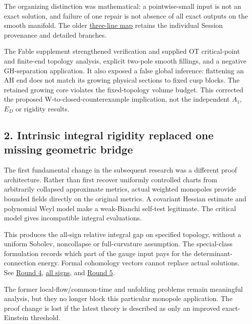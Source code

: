 \documentclass[
  10pt,
]{article}
\begin{document}
The organizing distinction was mathematical: a pointwise-small input is
not an exact solution, and failure of one repair is not absence of all
exact outputs on the smooth manifold. The older
\href{../mathematics/current/skill/references/research-map.md}{three-line
map} retains the individual Session provenance and detailed branches.

The Fable supplement strengthened verification and supplied OT
critical-point and finite-end topology analysis, explicit two-pole
smooth fillings, and a negative GH-separation application. It also
exposed a false global inference: flattening an AH end does not match
its growing physical sections to fixed cusp blocks. The retained growing
core violates the fixed-topology volume budget. This corrected the
proposed W-to-closed-counterexample implication, not the independent
\(A_1\), \(E_D\) or rigidity results.

\hypertarget{intrinsic-integral-rigidity-replaced-one-missing-geometric-bridge}{%
\subsection{2. Intrinsic integral rigidity replaced one missing
geometric
bridge}\label{intrinsic-integral-rigidity-replaced-one-missing-geometric-bridge}}

The first fundamental change in the subsequent research was a different
proof architecture. Rather than first recover uniformly controlled
charts from arbitrarily collapsed approximate metrics, actual weighted
monopoles provide bounded fields directly on the original metrics. A
covariant Hessian estimate and polynomial Weyl model make a weak-Bianchi
self-test legitimate. The critical model gives incompatible integral
evaluations.

This produces the all-sign relative integral gap on specified topology,
without a uniform Sobolev, noncollapse or full-curvature assumption. The
special-class formulation records which part of the gauge input pays for
the determinant-connection energy. Formal cohomology vectors cannot
replace actual solutions. See
\href{../mathematics/current/round4_rigidity.md}{Round 4},
\href{../mathematics/current/round4_all_sign_gap.md}{all signs}, and
\href{../mathematics/current/round5_rigidity.md}{Round 5}.

The former local-flow/common-time and unfolding problems remain
meaningful analysis, but they no longer block this particular monopole
application. The proof change is lost if the latest theory is described
as only an improved exact-Einstein threshold.
\end{document}
